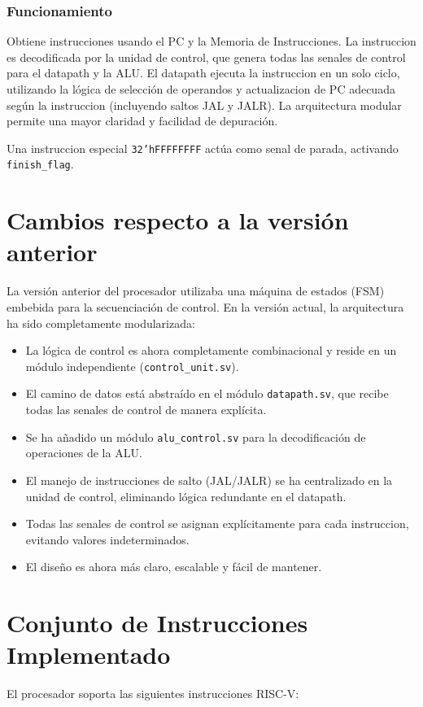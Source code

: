 \documentclass[conference]{IEEEtran}
\begin{document}
\subsubsection{Funcionamiento}
Obtiene instrucciones usando el PC y la Memoria de Instrucciones. La instruccion es decodificada por la unidad de control, que genera todas las senales de control para el datapath y la ALU. El datapath ejecuta la instruccion en un solo ciclo, utilizando la lógica de selección de operandos y actualizacion de PC adecuada según la instruccion (incluyendo saltos JAL y JALR). La arquitectura modular permite una mayor claridad y facilidad de depuración.

Una instruccion especial \texttt{32'hFFFFFFFF} actúa como senal de parada, activando \texttt{finish\_flag}.

\section{Cambios respecto a la versión anterior}
\label{sec:changes}
La versión anterior del procesador utilizaba una máquina de estados (FSM) embebida para la secuenciación de control. En la versión actual, la arquitectura ha sido completamente modularizada:
\begin{itemize}
    \item La lógica de control es ahora completamente combinacional y reside en un módulo independiente (\texttt{control\_unit.sv}).
    \item El camino de datos está abstraído en el módulo \texttt{datapath.sv}, que recibe todas las senales de control de manera explícita.
    \item Se ha añadido un módulo \texttt{alu\_control.sv} para la decodificación de operaciones de la ALU.
    \item El manejo de instrucciones de salto (JAL/JALR) se ha centralizado en la unidad de control, eliminando lógica redundante en el datapath.
    \item Todas las senales de control se asignan explícitamente para cada instruccion, evitando valores indeterminados.
    \item El diseño es ahora más claro, escalable y fácil de mantener.
\end{itemize}

\section{Conjunto de Instrucciones Implementado}
\label{sec:instruction_set}
El procesador soporta las siguientes instrucciones RISC-V:
\end{document}
